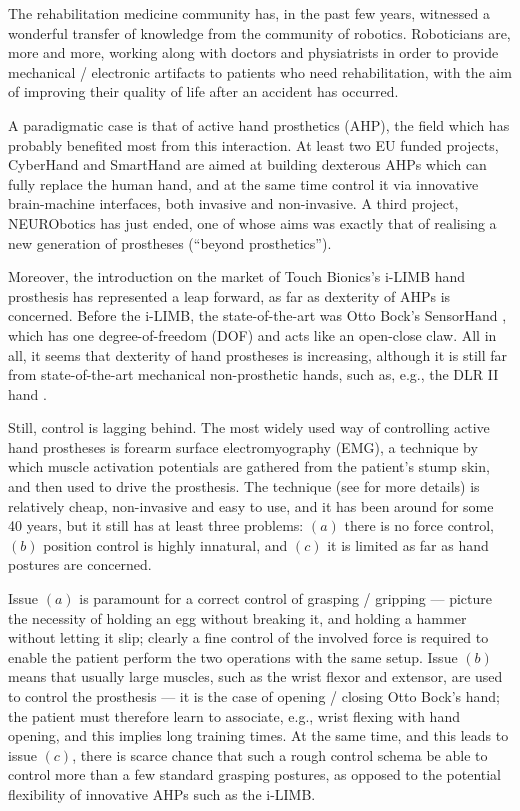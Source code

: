 The rehabilitation medicine community has, in the past few years,
witnessed a wonderful transfer of knowledge from the community of
robotics. Roboticians are, more and more, working along with doctors
and physiatrists in order to provide mechanical / electronic artifacts
to patients who need rehabilitation, with the aim of improving their
quality of life after an accident has occurred.

A paradigmatic case is that of active hand prosthetics (AHP), the
field which has probably benefited most from this interaction. At
least two EU funded projects, CyberHand \cite{cyberhand} and SmartHand
\cite{smarthand} are aimed at building dexterous AHPs which can fully
replace the human hand, and at the same time control it via innovative
brain-machine interfaces, both invasive and non-invasive. A third
project, NEURObotics \cite{neurobotics} has just ended, one of whose
aims was exactly that of realising a new generation of prostheses
(``beyond prosthetics'').

Moreover, the introduction on the market of Touch Bionics's i-LIMB
hand prosthesis \cite{ilimb} has represented a leap forward, as far as
dexterity of AHPs is concerned. Before the i-LIMB, the
state-of-the-art was Otto Bock's SensorHand \cite{sensorhand}, which
has one degree-of-freedom (DOF) and acts like an open-close claw. All
in all, it seems that dexterity of hand prostheses is increasing,
although it is still far from state-of-the-art mechanical
non-prosthetic hands, such as, e.g., the DLR II hand \cite{Hua2006}.

Still, control is lagging behind. The most widely used way of
controlling active hand prostheses is forearm surface electromyography
(EMG), a technique by which muscle activation potentials are gathered
from the patient's stump skin, and then used to drive the
prosthesis. The technique (see \cite{deluca} for more details) is
relatively cheap, non-invasive and easy to use, and it has been around
for some 40 years, but it still has at least three problems: $(a)$
there is no force control, $(b)$ position control is highly innatural,
and $(c)$ it is limited as far as hand postures are concerned.

Issue $(a)$ is paramount for a correct control of grasping / gripping
--- picture the necessity of holding an egg without breaking it, and
holding a hammer without letting it slip; clearly a fine control of
the involved force is required to enable the patient perform the two
operations with the same setup. Issue $(b)$ means that usually large
muscles, such as the wrist flexor and extensor, are used to control
the prosthesis --- it is the case of opening / closing Otto Bock's
hand; the patient must therefore learn to associate, e.g., wrist
flexing with hand opening, and this implies long training times. At
the same time, and this leads to issue $(c)$, there is scarce chance
that such a rough control schema be able to control more than a few
standard grasping postures, as opposed to the potential flexibility of
innovative AHPs such as the i-LIMB.


